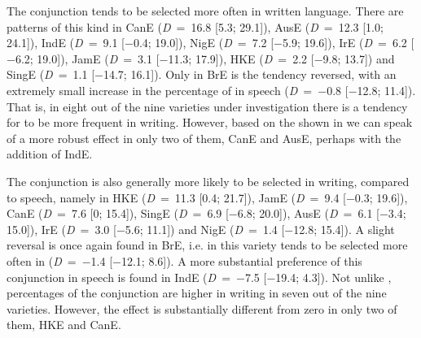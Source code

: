 The conjunction  tends to be selected more often in written language. There are patterns of this kind in CanE (\textit{D}~=~16.8 [5.3; 29.1]), AusE (\textit{D}~=~12.3 [1.0; 24.1]), IndE (\textit{D}~=~9.1 [$-$0.4; 19.0]), NigE (\textit{D}~=~7.2 [$-$5.9; 19.6]), IrE (\textit{D}~=~6.2 [$-$6.2; 19.0]), JamE (\textit{D}~=~3.1 [$-$11.3; 17.9]), HKE (\textit{D}~=~2.2 [$-$9.8; 13.7]) and SingE (\textit{D}~=~1.1 [$-$14.7; 16.1]). Only in BrE is the tendency reversed, with an extremely small increase in the percentage of  in speech (\textit{D}~=~$-$0.8 [$-$12.8; 11.4]). That is, in eight out of the nine varieties under investigation there is a tendency for  to be more frequent in writing. However, based on the  shown in  we can speak of a more robust effect in only two of them, CanE and AusE, perhaps with the addition of IndE.

The conjunction  is also generally more likely to be selected in writing, compared to speech, namely in HKE (\textit{D}~=~11.3 [0.4; 21.7]), JamE (\textit{D}~=~9.4 [$-$0.3; 19.6]), CanE (\textit{D}~=~7.6 [0; 15.4]), SingE (\textit{D}~=~6.9 [$-$6.8; 20.0]), AusE (\textit{D}~=~6.1 [$-$3.4; 15.0]), IrE (\textit{D}~=~3.0 [$-$5.6; 11.1]) and NigE (\textit{D}~=~1.4 [$-$12.8; 15.4]). A slight reversal is once again found in BrE, i.e. in this variety  tends to be selected more often in  (\textit{D}~=~$-$1.4 [$-$12.1; 8.6]). A more substantial preference of this conjunction in speech is found in IndE (\textit{D}~=~$-$7.5 [$-$19.4; 4.3]). Not unlike , percentages of the conjunction  are higher in writing in seven out of the nine varieties. However, the effect is substantially different from zero in only two of them, HKE and CanE.

